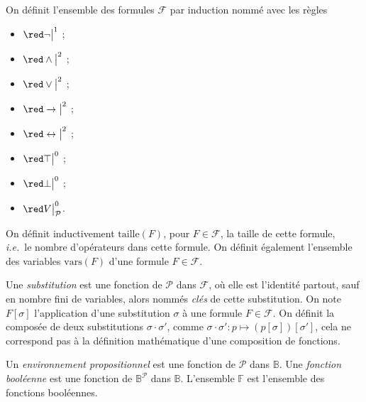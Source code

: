 \begin{multicols}{2}
	\begin{recap-box}
		On définit l'ensemble des formules $\mathcal{F}$\/ par induction nommé avec les règles
		\vspace{-2\baselineskip}
		\begin{multicols}{2}
			\begin{itemize}
				\item $\red\lnot\big|^1$\/ ;
				\item $\red\land\big|^2$\/ ;
				\item $\red\lor\big|^2$\/ ;
				\item $\red\to\big|^2$\/ ;
				\item $\red\leftrightarrow\big|^2$\/ ;
				\item $\red\top\big|^0$\/ ;
				\item $\red\bot\big|^0$\/ ;
				\item $\red V\big|^0_{\mathcal{P}}$.
			\end{itemize}
		\end{multicols}
	\end{recap-box}
	\begin{recap-box}
		On définit inductivement $\mathrm{taille}(F)$, pour $F \in \mathcal{F}$, la taille de cette formule, \textit{i.e.}\ le nombre d'opérateurs dans cette formule.
		On définit également l'ensemble des variables $\mathrm{vars}(F)$\/ d'une formule $F \in \mathcal{F}$.
	\end{recap-box}
	\begin{recap-box}
		Une \textit{substitution} est une fonction de $\mathcal{P}$\/ dans $\mathcal{F}$, où elle est l'identité partout, sauf en nombre fini de variables, alors nommés \textit{clés} de cette substitution.
		On note $F[\sigma]$\/ l'application d'une substitution $\sigma$\/ à une formule $F \in \mathcal{F}$.
		On définit la composée de deux substitutions $\sigma \cdot \sigma'$, comme $\sigma \cdot \sigma' : p \mapsto (p[\sigma])[\sigma']$, {\color{red} cela ne correspond pas à la définition mathématique d'une composition de fonctions}.
	\end{recap-box}
	\recapsep{Fonctions booléennes}
	\begin{recap-box}
		Un \textit{environnement propositionnel} est une fonction de $\mathcal{P}$\/ dans $\mathds{B}$.
		Une \textit{fonction booléenne} est une fonction de $\mathds{B}^\mathcal{P}$\/ dans $\mathds{B}$. L'ensemble $\mathds{F}$\/ est l'ensemble des fonctions booléennes.
	\end{recap-box}

\end{multicols}
